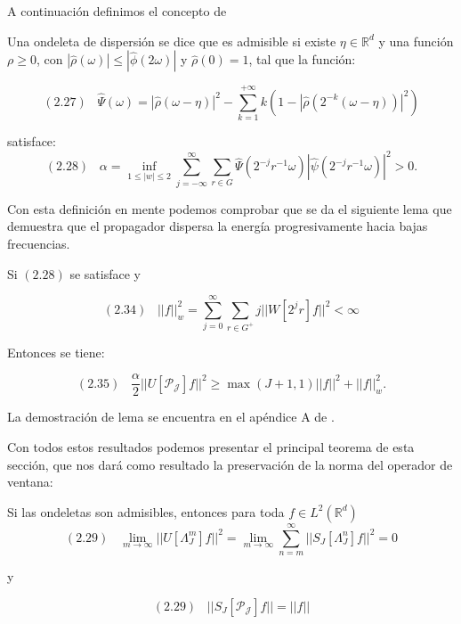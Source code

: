 \noindent A continuación definimos el concepto de 
\begin{definicion}
  Una ondeleta de dispersión se dice que es admisible si existe $\eta \in \mathbb{R}^d$ y una función $\rho \geq 0$, con $|\widehat{\rho}(\omega)| \leq |\widehat{\phi}(2\omega)|$ y $\widehat{\rho}(0)=1$, tal que la función: 

$$(2.27) \;\;\; \widehat{\Psi}(\omega)=|\widehat{\rho}(\omega - \eta)|^2 - \sum_{k=1}^{+\infty} k(1-|\widehat{\rho}(2^{-k}(\omega - \eta))|^2)$$

\noindent satisface: 
$$(2.28) \;\;\; \alpha= \inf_{1\leq|w|\leq2} \sum_{j=-\infty}^{\infty} \sum_{r\in G} \widehat{\Psi} (2^{-j}r^{-1}\omega)|\widehat{\psi}(2^{-j}r^{-1}\omega)|^2>0.$$
\end{definicion}

\noindent Con esta definición en mente podemos comprobar que se da el siguiente lema que demuestra que el propagador dispersa la energía progresivamente hacia bajas frecuencias.

\begin{lema} \label{lema::Admisibilidad}
Si $(2.28)$ se satisface y 

$$(2.34) \;\;\; ||f||_w^2=\sum_{j=0}^\infty \sum_{r\in G^+} j ||W[2^j r] f||^2 < \infty$$

\noindent Entonces se tiene: 

$$(2.35) \;\;\; \frac{\alpha}{2}||U[\mathcal{P_J}]f||^2 \geq \max (J+1,1) ||f||^2 + ||f||_w^2.$$
\end{lema}

\medskip

\noindent La demostración de lema se encuentra en el apéndice A de \cite{GroupInvariantScattering}.

\medskip

\noindent Con todos estos resultados podemos presentar el principal teorema de esta sección, que nos dará como resultado la preservación de la norma del operador de ventana:


\begin{teorema} \label{teoremaOndeletasAdmisibles}
\noindent Si las ondeletas son admisibles, entonces para toda $f\in L^2(\mathbb{R}^d)$
$$(2.29) \;\;\; \lim_{m\rightarrow\infty} ||U[\Lambda_J^m]f||^2=\lim_{m\rightarrow\infty} \sum_{n=m}^{\infty} ||S_J[\Lambda_J^n]f||^2=0$$

y

$$(2.29) \;\;\; ||S_J[\mathcal{P_J}]f||=||f||$$
\end{teorema}

